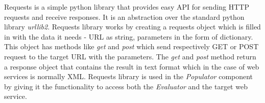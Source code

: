 Requests\cite{requests} is a simple python library that provides easy API for sending HTTP requests and receive responses. It is an
abstraction over the standard python library \textit{urllib2}. Requests library works by creating a requests object
which is filled in with the data it needs - URL as string, parameters in the form of dictionary. This object has methods like \textit{get} and \textit{post}
which send respectively GET or POST request to the target URL with the parameters. The \textit{get} and \textit{post} method return a
response object that contains the result in text format which in the case of web services is normally XML. Requests library
is used in the \textit{Populator} component by giving it the functionality to access both the \textit{Evaluator} and the
target web service.
